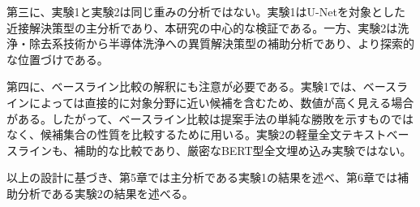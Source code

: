 第三に、実験1と実験2は同じ重みの分析ではない。実験1はU-Netを対象とした近接解決策型の主分析であり、本研究の中心的な検証である。一方、実験2は洗浄・除去系技術から半導体洗浄への異質解決策型の補助分析であり、より探索的な位置づけである。

第四に、ベースライン比較の解釈にも注意が必要である。実験1では、ベースラインによっては直接的に対象分野に近い候補を含むため、数値が高く見える場合がある。したがって、ベースライン比較は提案手法の単純な勝敗を示すものではなく、候補集合の性質を比較するために用いる。実験2の軽量全文テキストベースラインも、補助的な比較であり、厳密なBERT型全文埋め込み実験ではない。

以上の設計に基づき、第5章では主分析である実験1の結果を述べ、第6章では補助分析である実験2の結果を述べる。
